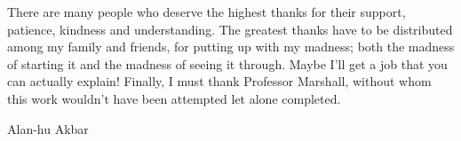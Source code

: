 There are many people who deserve the highest thanks for their support, patience, kindness and understanding.
The greatest thanks have to be distributed among my family and friends, for putting up with my madness; both the madness of starting it and the madness of seeing it through.
Maybe I'll get a job that you can actually explain! 
Finally, I must thank Professor Marshall, without whom this work wouldn't have been attempted let alone completed.

{\centering
Alan-hu Akbar\par
}
